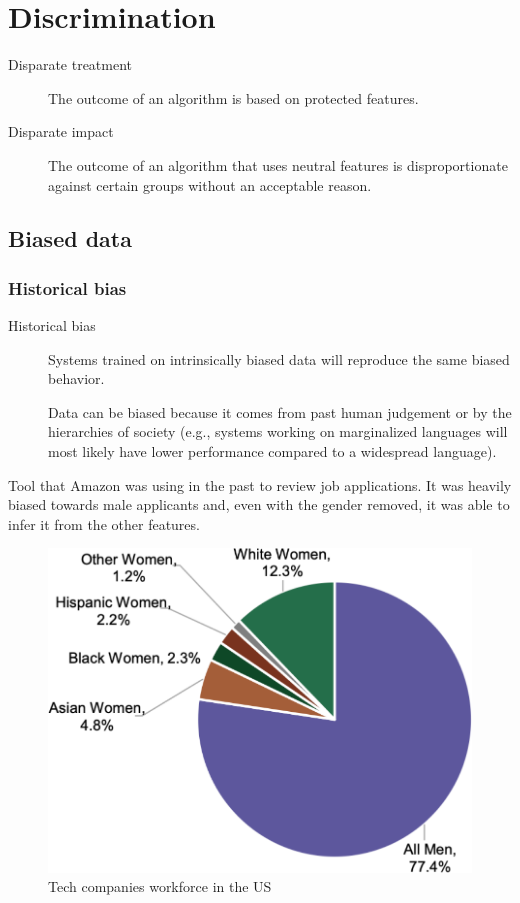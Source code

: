 \chapter{Discrimination}

\begin{description}
    \item[Disparate treatment] 
        The outcome of an algorithm is based on protected features.

    \item[Disparate impact] 
        The outcome of an algorithm that uses neutral features is disproportionate against certain groups without an acceptable reason.
\end{description}


\section{Biased data}


\subsection{Historical bias}

\begin{description}
    \item[Historical bias] 
        Systems trained on intrinsically biased data will reproduce the same biased behavior.

        \begin{remark}
            Data can be biased because it comes from past human judgement or by the hierarchies of society (e.g., systems working on marginalized languages will most likely have lower performance compared to a widespread language).
        \end{remark}
\end{description}

\begin{example}
    Tool that Amazon was using in the past to review job applications. It was heavily biased towards male applicants and, even with the gender removed, it was able to infer it from the other features.

    \begin{figure}[H]
        \centering
        \includegraphics[width=0.3\linewidth]{./img/tech_workforce.png}
        \caption{Tech companies workforce in the US}
    \end{figure}
\end{example}

